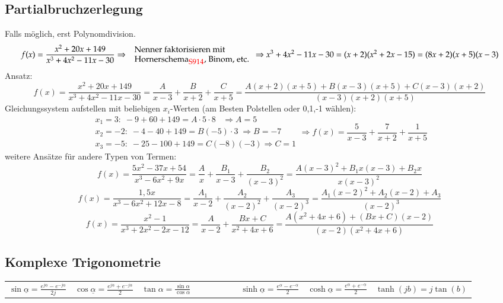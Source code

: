 	 \subsection{Partialbruchzerlegung}
		Falls möglich, erst Polynomdivision.
		\[f(x)=\frac{x^2+20x+149}{x^3+4x^2-11x-30} \Rightarrow \; \begin{array}{l}\text{Nenner faktorisieren mit}\\
		\text{Hornerschema$_{\textcolor{red}{\mbox{\small{S914}}}}$, Binom, etc.}\end{array} \Rightarrow x^{3}+4x^{2}-11x-30=(x+2)(x^{2}+2x-15)=(8x+2)(x+5)(x-3)\]
		Ansatz:
		\[f(x)=\frac{x^2+20x+149}{x^3+4x^2-11x-30}=\frac{A}{x-3} + \frac{B}{x+2} + \frac{C}{x+5}=
		\frac{A(x+2)(x+5)+B(x-3)(x+5)+C(x-3)(x+2)}{(x-3)(x+2)(x+5)}\]
		Gleichungssystem aufstellen mit beliebigen $x_i$-Werten (am Besten Polstellen oder 0,1,-1 wählen):
		\[\begin{array}{l}x_1=3:\;-9+60+149=A\cdot5\cdot8\;\;\;\Rightarrow A=5\\
		x_2=-2:\;-4-40+149=B(-5)\cdot3\; \Rightarrow B=-7\\
		x_3=-5:\;-25-100+149=C(-8)(-3) \Rightarrow C=1 \end{array} \Rightarrow f(x)=\frac{5}{x-3}+\frac{7}{x+2}+\frac{1}{x+5}\]
		weitere Ansätze für andere Typen von Termen:
		\[f(x)=\frac{5x^2-37x+54}{x^3-6x^2+9x}=\frac{A}{x}+\frac{B_1}{x-3}+\frac{B_2}{(x-3)^2}=\frac{A(x-3)^2+B_1x(x-3)+B_2x}{x(x-3)^2}\]
		\[f(x)=\frac{1,5x}{x^3-6x^2+12x-8}=\frac{A_1}{x-2}+\frac{A_2}{(x-2)^2}+\frac{A_3}{(x-2)^3}=\frac{A_1(x-2)^2+A_2(x-2)+A_3}{(x-2)^3}\]
		\[f(x)=\frac{x^2-1}{x^3+2x^2-2x-12}=\frac{A}{x-2}+\frac{Bx+C}{x^2+4x+6}=\frac{A(x^2+4x+6)+(Bx+C)(x-2)}{(x-2)(x^2+4x+6)}\]
	\subsection {Komplexe Trigonometrie}
\begin{tabular}{lllllll}
$\sin{\underline{\alpha}} = \frac{e^{j\underline{\alpha}} - e^{-j\underline{\alpha}}}{2j}$ &

$\cos{\underline{\alpha}} = \frac{e^{j\underline{\alpha}} + e^{-j\underline{\alpha}}}{2}$ &

$\tan{\alpha} = \frac{\sin \alpha}{\cos \alpha}$ & 

$ \qquad \qquad $ &

$\sinh{\underline{\alpha}} = \frac{e^{\underline{\alpha}} - e^{-\underline{\alpha}}}{2} $ &

$\cosh{\underline{\alpha}} = \frac{e^{\underline{\alpha}} + e^{-\underline{\alpha}}}{2} $ &

		$\tanh(jb)=j \tan(b)$ 
\end{tabular}
							
	 